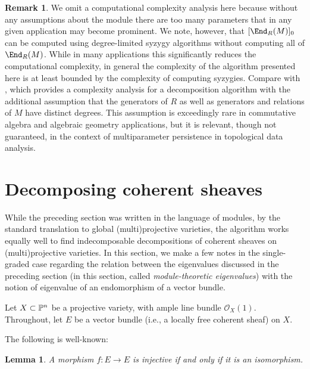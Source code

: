 \documentclass[12pt]{article}
\def\OO{\mathcal O}
\theoremstyle{theorem}
\numberwithin{thm}{section}
\newtheorem{lem}[thm]{Lemma}
\theoremstyle{definition}
\newtheorem{rem}[thm]{Remark}
\begin{document}
\begin{rem}
  We omit a computational complexity analysis here because without any assumptions about the module there are too many parameters that in any given application may become prominent. We note, however, that $[\End_R(M)]_0$ can be computed using degree-limited syzygy algorithms without computing all of $\End_R(M)$. While in many applications this significantly reduces the computational complexity, in general the complexity of the algorithm presented here is at least bounded by the complexity of computing syzygies. Compare with \cite{DX22}, which provides a complexity analysis for a decomposition algorithm with the additional assumption that the generators of $R$ as well as generators and relations of $M$ have distinct degrees. This assumption is exceedingly rare in commutative algebra and algebraic geometry applications, but it is relevant, though not guaranteed, in the context of multiparameter persistence in topological data analysis.
\end{rem}

\section{Decomposing coherent sheaves}\label{sec:coherent}

While the preceding section was written in the language of modules, by the standard translation to global (multi)projective varieties, the algorithm works equally well to find indecomposable decompositions of coherent sheaves on (multi)projective varieties.
In this section, we make a few notes in the single-graded case regarding the relation between the eigenvalues discussed in the preceding section (in this section, called \emph{module-theoretic eigenvalues}) with the notion of eigenvalue of an endomorphism of a vector bundle.

Let $X\subset \P^n$ be a projective variety, with ample line bundle $\OO_X(1)$.
Throughout, let $E$ be a vector bundle (i.e., a locally free coherent sheaf) on $X$.

The following is well-known:

\begin{lem}{{\cite[Exercise~4.1]{Friedman98}}}
  A morphism $f:E\to E$ is injective if and only if it is an isomorphism.
\end{lem}

\end{document}
